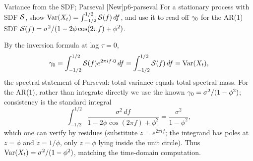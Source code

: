 \begin{exercise}{Variance from the SDF; Parseval \quad\textnormal{[New]}}{p6-parseval}
For a stationary process with SDF $\mathcal{S}$, show
$\operatorname{Var}(X_t)=\int_{-1/2}^{1/2}\mathcal{S}(f)\,df$, and use it to read off $\gamma_0$ for
the AR(1) SDF $\mathcal{S}(f)=\sigma^2/(1-2\phi\cos(2\pi f)+\phi^2)$.
\end{exercise}
\begin{solution}
By the inversion formula at lag $\tau=0$,
\[
\gamma_0=\int_{-1/2}^{1/2}\mathcal{S}(f)e^{2\pi i f\cdot 0}\,df
=\int_{-1/2}^{1/2}\mathcal{S}(f)\,df=\operatorname{Var}(X_t),
\]
the spectral statement of Parseval: total variance equals total spectral mass.
For the AR(1), rather than integrate directly we use the known
$\gamma_0=\sigma^2/(1-\phi^2)$; consistency is the standard integral
\[
\int_{-1/2}^{1/2}\frac{\sigma^2\,df}{1-2\phi\cos(2\pi f)+\phi^2}
=\frac{\sigma^2}{1-\phi^2},
\]
which one can verify by residues (substitute $z=e^{2\pi i f}$; the integrand has
poles at $z=\phi$ and $z=1/\phi$, only $z=\phi$ lying inside the unit circle).
Thus $\operatorname{Var}(X_t)=\sigma^2/(1-\phi^2)$, matching the time-domain computation.
\end{solution}
